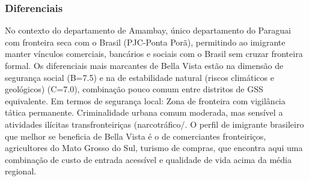 \subsubsection*{Diferenciais}\label{dif-bella-vista-1302}
No contexto do departamento de Amambay, único departamento do Paraguai com fronteira seca com o Brasil (PJC-Ponta Porã), permitindo ao imigrante manter vínculos comerciais, bancários e sociais com o Brasil sem cruzar fronteira formal. Os diferenciais mais marcantes de Bella Vista estão na dimensão de segurança social (B=7.5) e na de estabilidade natural (riscos climáticos e geológicos) (C=7.0), combinação pouco comum entre distritos de GSS equivalente. Em termos de segurança local: Zona de fronteira com vigilância tática permanente. Criminalidade urbana comum moderada, mas sensível a atividades ilícitas transfronteiriças (narcotráfico/. O perfil de imigrante brasileiro que melhor se beneficia de Bella Vista é o de comerciantes fronteiriços, agricultores do Mato Grosso do Sul, turismo de compras, que encontra aqui uma combinação de custo de entrada acessível e qualidade de vida acima da média regional.
